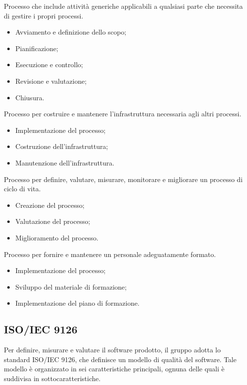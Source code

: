 Processo che include attività generiche applicabili a qualsiasi parte che necessita di gestire i propri processi.
\begin{itemize}
    \item Avviamento e definizione dello scopo;
    \item Pianificazione;
    \item Esecuzione e controllo;
    \item Revisione e valutazione;
    \item Chiusura.
\end{itemize}

Processo per costruire e mantenere l'infrastruttura necessaria agli altri processi.
\begin{itemize}
    \item Implementazione del processo;
    \item Costruzione dell'infrastruttura;
    \item Manutenzione dell'infrastruttura.
\end{itemize}

Processo per definire, valutare, misurare, monitorare e migliorare
un processo di ciclo di vita.
\begin{itemize}
    \item Creazione del processo;
    \item Valutazione del processo;
    \item Miglioramento del processo.
\end{itemize}

Processo per fornire e mantenere un personale adeguatamente formato.
\begin{itemize}
    \item Implementazione del processo;
    \item Sviluppo del materiale di formazione;
    \item Implementazione del piano di formazione.
\end{itemize}

\subsection{ISO/IEC 9126}
Per definire, misurare e valutare il software prodotto, il gruppo adotta lo 
standard ISO/IEC 9126, che definisce un modello di qualità del software. Tale 
modello è organizzato in sei caratteristiche principali, 
ognuna delle quali è suddivisa in sottocaratteristiche.

